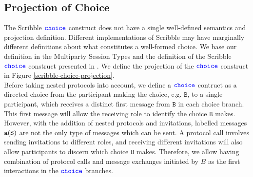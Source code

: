 \documentclass[12pt,twoside]{report}
\begin{document}


 


\subsection{Projection of Choice}

The Scribble ${\color{blue}\mathtt{choice}}$ construct does not have a single well-defined semantics and projection definition. Different implementations of Scribble may have marginally different definitions about what constitutes a well-formed choice.  We base our definition in the Multiparty Session Types\cite{gentleintrotompst} and the definition of the Scribble ${\color{blue}\mathtt{choice}}$ construct presented in \cite{featherweight}. We define the projection of the ${\color{blue}\mathtt{choice}}$ construct in Figure \ref{scribble-choice-projection}.\\


Before taking nested protocols into account, we define a ${\color{blue}\mathtt{choice}}$ contruct as a directed choice from the participant making the choice, e.g. $\mathtt{B}$, to a single participant, which receives a distinct first message from $\mathtt{B}$ in each choice branch. This first message will allow the receiving role to identify the choice $\mathtt{B}$ makes. However, with the addition of nested protocols and invitations, labelled messages $\mathtt{a}(\mathtt{S})$ are not the only type of messages which can be sent. A protocol call involves sending invitations to different roles, and receiving different invitations will also allow participants to discern which choice $\mathtt{B}$ makes. Therefore, we allow having combination of protocol calls and message exchanges initiated by $B$ as the first interactions in the ${\color{blue}\mathtt{choice}}$ branches.\\
\end{document}
